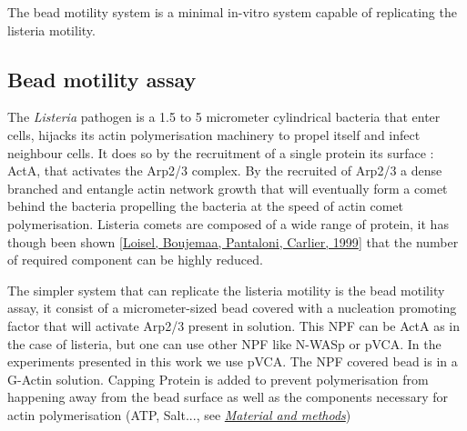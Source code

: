 \documentclass[A4paperpaper,11pt,english]{sphinxmanual}
\begin{document}
The bead motility system is a minimal in-vitro system capable of replicating
the listeria motility.


\subsection{Bead motility assay}
\label{parts/part1:bead-motility-assay}\label{parts/part1:id48}
The \emph{Listeria} pathogen is a 1.5 to 5 micrometer cylindrical bacteria that
enter cells, hijacks its actin polymerisation machinery to propel itself and
infect neighbour cells. It does so by the recruitment of a single protein its
surface : ActA, that activates the Arp2/3 complex. By the recruited of Arp2/3 a
dense branched and entangle actin network growth that will eventually form a
comet behind the bacteria propelling the bacteria at the speed of actin comet
polymerisation. Listeria comets are composed of a wide range of protein, it has
though been shown {\hyperref[parts/part1:loisel1999]{{[}Loisel, Boujemaa, Pantaloni, Carlier,  1999{]}}} that the number of required component can
be highly reduced.

The simpler system that can replicate the listeria motility is the bead
motility assay, it consist of a micrometer-sized bead covered with a nucleation
promoting factor that will activate Arp2/3 present in solution.  This NPF can
be ActA as in the case of listeria, but one can use other NPF like N-WASp or
pVCA. In the experiments presented in this work  we use pVCA. The NPF covered
bead is in a G-Actin solution. Capping Protein is added to prevent
polymerisation from happening away from the bead surface as well as the
components necessary for actin polymerisation (ATP, Salt..., see {\hyperref[parts/part2:m-et-m]{\emph{Material and methods}}})
\end{document}
